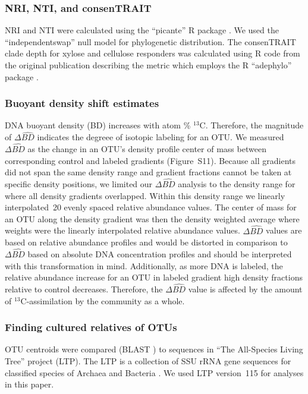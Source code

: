 \documentclass{article}
\begin{document}
\subsubsection{NRI, NTI, and consenTRAIT}
NRI and NTI were calculated using the ``picante'' R package
\citep{kembel2010}. We used the ``independentswap'' null model for
phylogenetic distribution. The consenTRAIT clade depth for xylose and cellulose
responders was calculated using R code from the original publication describing
the metric \citep{Martiny2013} which employs the R ``adephylo'' package
\citep{jombart2010}.

\subsubsection{Buoyant density shift estimates}
DNA buoyant density (BD) increases with atom \% $^{13}$C. Therefore, the
magnitude of $\Delta\hat{BD}$ indicates the degreee of isotopic labeling
for an OTU. We measured $\Delta\hat{BD}$ as the change in an OTU's density
profile center of mass between corresponding control and labeled gradients
(Figure~S11). Because all gradients did not span the same density range and
gradient fractions cannot be taken at specific density positions, we limited
our $\Delta\hat{BD}$ analysis to the density range for where all density gradients
overlapped. Within this density range we linearly interpolated~20
evenly spaced relative abundance values. The center of mass for an OTU along
the density gradient was then the density weighted average where weights were
the linearly interpolated relative abundance values. $\Delta\hat{BD}$ values are based on
relative abundance profiles and would be distorted in comparison to
$\Delta\hat{BD}$ based on absolute DNA concentration profiles and should be
interpreted with this transformation in mind. Additionally, as more DNA is labeled,
the relative abundance increase for an OTU in labeled gradient high density fractions
relative to control decreases. Therefore, the $\Delta\hat{BD}$ value is affected by
the amount of $^{13}$C-assimilation by the community as a whole.

\subsubsection{Finding cultured relatives of OTUs}
OTU centroids were compared (BLAST \citep{altschul1990,camacho2009}) to
sequences in ``The All-Species Living Tree'' project (LTP). The LTP is
a collection of SSU rRNA gene sequences for classified species of Archaea
and Bacteria \citep{yarza2008}. We used LTP version~115 for analyses in
this paper.
\end{document}
